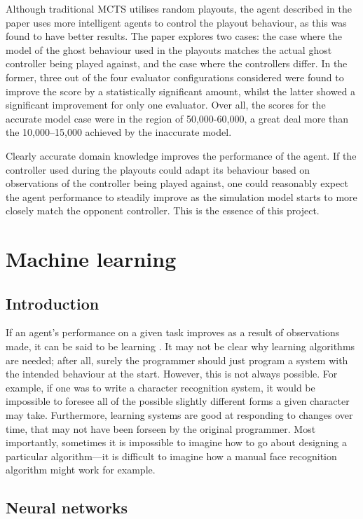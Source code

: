 Although traditional MCTS utilises random playouts, the agent described in the paper uses more intelligent agents to control the playout behaviour, as this was found to have better results.  The paper explores two cases: the case where the model of the ghost behaviour used in the playouts matches the actual ghost controller being played against, and the case where the controllers differ.  In the former, three out of the four evaluator configurations considered were found to improve the score by a statistically significant amount, whilst the latter showed a significant improvement for only one evaluator.  Over all, the scores for the accurate model case were in the region of 50,000-60,000, a great deal more than the 10,000--15,000 achieved by the inaccurate model.

Clearly accurate domain knowledge improves the performance of the agent.  If the controller used during the playouts could adapt its behaviour based on observations of the controller being played against, one could reasonably expect the agent performance to steadily improve as the simulation model starts to more closely match the opponent controller.  This is the essence of this project.

\section{Machine learning}

\subsection{Introduction}

If an agent's performance on a given task improves as a result of observations made, it can be said to be learning \cite[p. 693]{RussellNorvig}.  It may not be clear why learning algorithms are needed; after all, surely the programmer should just program a system with the intended behaviour at the start.  However, this is not always possible.  For example, if one was to write a character recognition system, it would be impossible to foresee all of the possible slightly different forms a given character may take.  Furthermore, learning systems are good at responding to changes over time, that may not have been forseen by the original programmer.  Most importantly, sometimes it is impossible to imagine how to go about designing a particular algorithm---it is difficult to imagine how a manual face recognition algorithm might work for example.

\subsection{Neural networks}

